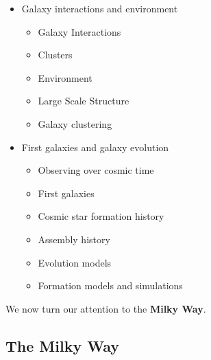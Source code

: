 \documentclass{article}
\begin{document}
\begin{itemize}
\begin{itemize}
    \end{itemize}
    \item Galaxy interactions and environment
    \begin{itemize}
        \item Galaxy Interactions
        \item Clusters
        \item Environment
        \item Large Scale Structure
        \item Galaxy clustering
    \end{itemize}
    \item First galaxies and galaxy evolution
    \begin{itemize}
        \item Observing over cosmic time
        \item First galaxies
        \item Cosmic star formation history
        \item Assembly history
        \item Evolution models
        \item Formation models and simulations
    \end{itemize}
\end{itemize}

We now turn our attention to the\textbf{ Milky Way}.

\subsection{The Milky Way}
\end{document}
